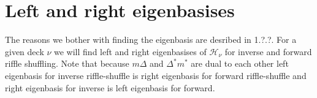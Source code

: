 \documentclass[a4paper, 12pt]{report}
\begin{document}
\chapter{Left and right eigenbasises}

The reasons we bother with finding the eigenbasis are desribed in 1.?.?. For a given deck $\nu$
we will find left and right eigenbasises of $\mathcal{H}_\nu$ for inverse and forward riffle shuffling.
Note that because
$m\Delta$ and $\Delta^*m^*$ are dual to each other left eigenbasis for inverse riffle-shuffle is right
eigenbasis for forward riffle-shuffle and right eigenbasis for inverse is left eigenbasis for forward.
\end{document}
